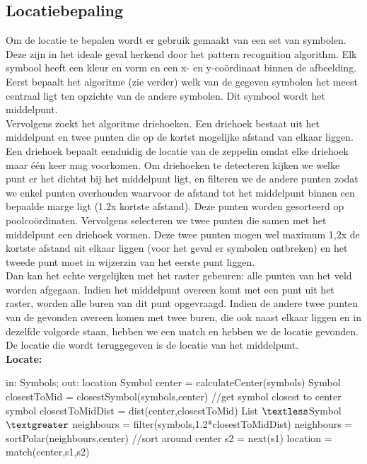 \documentclass[eind]{penoverslag}
\begin{document}
\subsection{Locatiebepaling}
Om de locatie te bepalen wordt er gebruik gemaakt van een set van symbolen. Deze zijn in het ideale geval herkend door het pattern recognition algorithm. Elk symbool heeft een kleur en vorm en een x- en y-coördinaat binnen de afbeelding. Eerst bepaalt het algoritme (zie verder) welk van de gegeven symbolen het meest centraal ligt ten opzichte van de andere symbolen. Dit symbool wordt het middelpunt.\\

Vervolgens zoekt het algoritme driehoeken. Een driehoek bestaat uit het middelpunt en twee punten die op de kortst mogelijke afstand van elkaar liggen. Een driehoek bepaalt eenduidig de locatie van de zeppelin omdat elke driehoek maar \'e\'en keer mag voorkomen. Om driehoeken te detecteren kijken we welke punt er het dichtst bij het middelpunt ligt, en filteren we de andere punten zodat we enkel punten overhouden waarvoor de afstand tot het middelpunt binnen een bepaalde marge ligt (1.2x kortste afstand). Deze punten worden gesorteerd op poolcoördinaten. Vervolgens selecteren we twee punten die samen met het middelpunt een driehoek vormen. Deze twee punten mogen wel maximum 1,2x de kortste afstand uit elkaar liggen (voor het geval er symbolen ontbreken) en het tweede punt moet in wijzerzin van het eerste punt liggen.\\

Dan kan het echte vergelijken met het raster gebeuren: alle punten van het veld worden afgegaan. Indien het middelpunt overeen komt met een punt uit het raster, worden alle buren van dit punt opgevraagd. Indien de andere twee punten van de gevonden overeen komen met twee buren, die ook naast elkaar liggen en in dezelfde volgorde staan, hebben we een match en hebben we de locatie gevonden. De locatie die wordt teruggegeven is de locatie van het middelpunt.\\

\textbf{Locate: }
\begin{algorithmic}

	\STATE in: Symbols; out: location
	\STATE Symbol center = calculateCenter(symbols)
	\STATE Symbol closestToMid = closestSymbol(symbols,center)     //get symbol closest to center symbol
	\STATE closestToMidDist = dist(center,closestToMid)
	\STATE List $\textless$Symbol$\textgreater$ neighbours = filter(symbols,1.2*closestToMidDist)
	\STATE neighbours = sortPolar(neighbours,center)     //sort around center
		\STATE s2 = next(s1) %
			\STATE location = match(center,s1,s2)
		\ENDIF
	\ENDFOR
	
\end{algorithmic}
\end{document}
